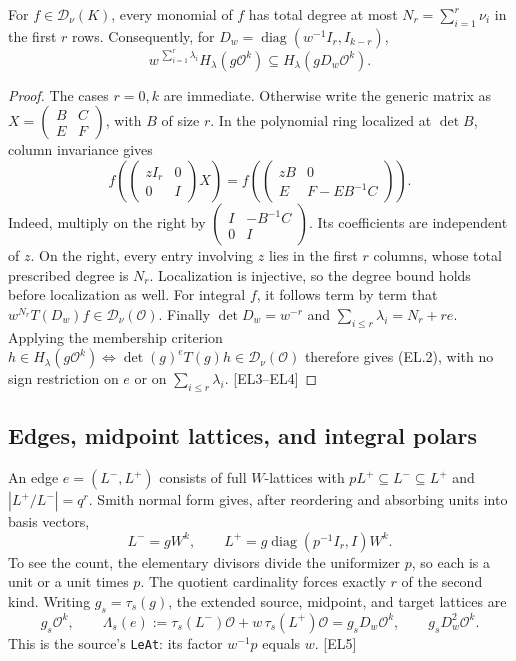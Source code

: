\begin{lemma}
\label{lem:edge-weight}
For $f\in\mathcal D_\nu(K)$, every monomial of $f$ has total degree at most
$N_r=\sum_{i=1}^r\nu_i$ in the first $r$ rows. Consequently, for
$D_w=\operatorname{diag}(w^{-1}I_r,I_{k-r})$,
\[
 w^{\,\sum_{i=1}^r\lambda_i}H_\lambda(g\mathcal O^k)
 \subseteq H_\lambda(gD_w\mathcal O^k).
 \tag{EL.2}
\]
\end{lemma}
\begin{proof}
The cases $r=0,k$ are immediate. Otherwise write the generic matrix as
$X=\left(\begin{smallmatrix}B&C\\ E&F\end{smallmatrix}\right)$, with $B$ of size $r$.
In the polynomial ring localized at $\det B$, column invariance gives
\[
 f\!\left(\begin{pmatrix}zI_r&0\\0&I\end{pmatrix}X\right)
 =
 f\!\left(\begin{pmatrix}zB&0\\ E&F-EB^{-1}C\end{pmatrix}\right).
 \tag{EL.3}
\]
Indeed, multiply on the right by
$\left(\begin{smallmatrix}I&-B^{-1}C\\0&I\end{smallmatrix}\right)$.
Its coefficients are independent of $z$. On the right, every entry involving $z$ lies in the first $r$ columns, whose total prescribed degree is $N_r$.
Localization is injective, so the degree bound holds before localization as well. For integral $f$, it follows term by term that
$w^{N_r}T(D_w)f\in\mathcal D_\nu(\mathcal O)$.
Finally $\det D_w=w^{-r}$ and $\sum_{i\le r}\lambda_i=N_r+re$.
Applying the membership criterion
$h\in H_\lambda(g\mathcal O^k)\iff\det(g)^eT(g)h\in\mathcal D_\nu(\mathcal O)$
therefore gives (EL.2), with no sign restriction on $e$ or on $\sum_{i\le r}\lambda_i$.
\textsf{[EL3--EL4]}
\end{proof}

\subsection{Edges, midpoint lattices, and integral polars}

An edge $e=(L^-,L^+)$ consists of full $W$-lattices with
$pL^+\subseteq L^-\subseteq L^+$ and $|L^+/L^-|=q^r$.
Smith normal form gives, after reordering and absorbing units into basis vectors,
\[
 L^-=gW^k,\qquad
 L^+=g\operatorname{diag}(p^{-1}I_r,I)W^k.
 \tag{EL.4}
\]
To see the count, the elementary divisors divide the uniformizer $p$, so each is a unit or a unit times $p$. The quotient cardinality forces exactly $r$ of the second kind.
Writing $g_s=\tau_s(g)$, the extended source, midpoint, and target lattices are
\[
 g_s\mathcal O^k,\qquad
 \Lambda_s(e):=\tau_s(L^-)\mathcal O+w\,\tau_s(L^+)\mathcal O
      =g_sD_w\mathcal O^k,\qquad
 g_sD_w^2\mathcal O^k .
 \tag{EL.5}
\]
This is the source's \texttt{LeAt}: its factor $w^{-1}p$ equals $w$.
\textsf{[EL5]}

